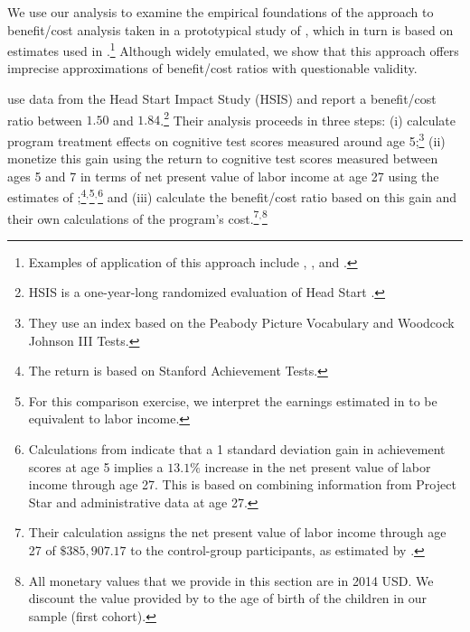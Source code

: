 \noindent We use our analysis to examine the empirical foundations of the approach to benefit/cost analysis taken in a prototypical study of \citet{Kline_Walters_2016_QJE}, which in turn is based on estimates used in \citet{Chetty_Friedman_etal_2011_QJoE}.\footnote{Examples of application of this approach include \citet{Attanasio_Kugler_Meghir_2011_AEJAE}, \cite{Behrman-et-al_2011_JHR-Progresa}, and \cite{Lafortune_etal_2018_Reform_AEJAE}.} Although widely emulated, we show that this approach offers imprecise approximations of benefit/cost ratios with questionable validity.

\citet{Kline_Walters_2016_QJE} use data from the Head Start Impact Study (HSIS) and report a benefit/cost ratio between $1.50$ and $1.84$.\footnote{HSIS is a one-year-long randomized evaluation of Head Start \citep{Puma_Bell_etal_2010_HeadStartImpact}.} Their analysis proceeds in three steps: (i) calculate program treatment effects on cognitive test scores measured around age 5;\footnote{They use an index based on the Peabody Picture Vocabulary and Woodcock Johnson III Tests.} (ii) monetize this gain using the return to cognitive test scores measured between ages 5 and 7 in terms of net present value of labor income at age 27 using the estimates of \citet{Chetty_Friedman_etal_2011_QJoE};\footnote{The \citet{Chetty_Friedman_etal_2011_QJoE} return is based on Stanford Achievement Tests.}$^,$\footnote{For this comparison exercise, we interpret the earnings estimated in \citet{Chetty_Friedman_etal_2011_QJoE} to be equivalent to labor income.}$^,$\footnote{Calculations from \citet{Chetty_Friedman_etal_2011_QJoE} indicate that a 1 standard deviation gain in achievement scores at age 5 implies a $13.1\%$ increase in the net present value of labor income through age 27. This is based on combining information from Project Star and administrative data at age 27.} and (iii) calculate the benefit/cost ratio based on this gain and their own calculations of the program's cost.\footnote{Their calculation assigns the net present value of labor income through age 27 of $\$385,907.17$ to the control-group participants, as estimated by  \citet{Chetty_Friedman_etal_2011_QJoE}.}$^,$\footnote{All monetary values that we provide in this section are in 2014 USD. We discount the value provided by \citet{Chetty_Friedman_etal_2011_QJoE} to the age of birth of the children in our sample (first cohort).}

